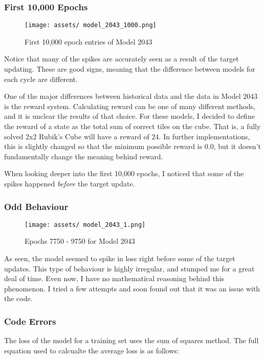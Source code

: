\documentclass[12pt]{article}
\begin{document}
\subsubsection{First 10,000 Epochs}

\begin{figure}[h]
	\centering
	\texttt{[image: assets/ model\_2043\_1000.png]}
	\caption{First 10,000 epoch entries of Model 2043}
\end{figure}

Notice that many of the spikes are accurately seen as a result of the target updating. These are good signs, meaning that the difference between models for each cycle are different.

One of the major differences between historical data and the data in Model 2043 is the reward system. Calculating reward can be one of many different methods, and it is unclear the results of that choice. For these models, I decided to define the reward of a state as the total sum of correct tiles on the cube. That is, a fully solved 2x2 Rubik's Cube will have a reward of $24$. In further implementations, this is slightly changed so that the minimum possible reward is $0.0$, but it doesn't fundamentally change the meaning behind reward.

When looking deeper into the first 10,000 epochs, I noticed that some of the spikes happened \textit{before} the target update.

\subsubsection{Odd Behaviour}

\begin{figure}[h]
	\centering
	\texttt{[image: assets/ model\_2043\_1.png]}
	\caption{Epochs 7750 - 9750 for Model 2043}
\end{figure}

As seen, the model seemed to spike in loss right before some of the target updates. This type of behaviour is highly irregular, and stumped me for a great deal of time. Even now, I have no mathematical reasoning behind this phenomenon. I tried a few attempts and soon found out that it was an issue with the code. 

\newpage

\subsubsection{Code Errors}

The loss of the model for a training set uses the sum of squares method. The full equation used to calcualte the average loss is as follows:
\end{document}
